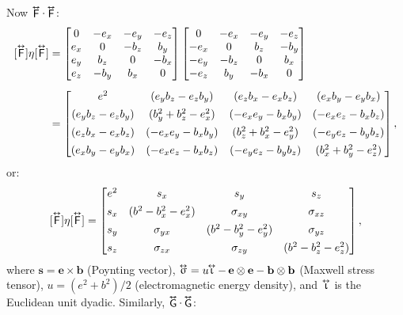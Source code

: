 \documentclass[12pt]{article}
\renewcommand{\vv}[1]{\mathbf{#1}}
\newcommand{\tightoverset}[2]{%
  \mathop{#2}\limits^{\vbox to -.5ex{\kern-0.75ex\hbox{$#1$}\vss}}}
\newcommand{\inlinedy}[1]{\tightoverset{\text{\tiny$\bm\leftrightarrow$}}{#1}}
\newcommand{\capdy}[1]{ \overset{ \text{\tiny$\bm\leftrightarrow$} }{\vphantom{\text{\small{A}}}\smash{#1}} }
\begin{document}
Now $\inlinedy{\mathsf{F}} \cdot \inlinedy{\mathsf{F}}$:
\begin{equation*}
\begin{aligned}
\mkern0mu [\capdy{\mathsf{F}}] \eta [\capdy{\mathsf{F}}]
&=
\begin{bmatrix}
0 & -e_x & -e_y & -e_z \\
e_x & 0 & -b_z & b_y \\
e_y & b_z & 0 & -b_x \\
e_z & -b_y & b_x & 0
\end{bmatrix}
\begin{bmatrix}
0 & -e_x & -e_y & -e_z \\
-e_x & 0 & b_z & -b_y \\
-e_y & -b_z & 0 & b_x \\
-e_z & b_y & -b_x & 0
\end{bmatrix} \\[5pt]
&=
\begin{bmatrix}
e^2 & (e_y b_z - e_z b_y) & (e_z b_x - e_x b_z) & (e_x b_y - e_y b_x) \\[1ex]
(e_y b_z - e_z b_y) & (b_y^2 + b_z^2 - e_x^2) & (-e_x e_y - b_x b_y) & (- e_x e_z - b_x b_z) \\[1ex]
(e_z b_x - e_x b_z) & (-e_x e_y - b_x b_y) & (b_z^2 + b_x^2 - e_y^2)  & (- e_y e_z - b_y b_z) \\[1ex]
(e_x b_y - e_y b_x) & (- e_x e_z - b_x b_z) & (- e_y e_z - b_y b_z) & (b_x^2 + b_y^2 - e_z^2)
\end{bmatrix} ,
\end{aligned}
\end{equation*}
or:
\begin{equation*}
\mkern0mu [\capdy{\mathsf{F}}] \eta [\capdy{\mathsf{F}}]
=
\begin{bmatrix}
e^2 & s_x & s_y & s_z \\[1ex]
s_x & (b^2 - b_x^2 - e_x^2) & \sigma_{x y} & \sigma_{x z} \\[1ex]
s_y & \sigma_{y x} & (b^2 - b_y^2 - e_y^2)  & \sigma_{y z} \\[1ex]
s_z & \sigma_{z x} & \sigma_{z y} & (b^2 - b_z^2 - e_z^2) 
\end{bmatrix} ,
\end{equation*}
where $\vv s = \vv e \times \vv b$ (Poynting vector), $\inlinedy{\upsigma} = u \mkern-5mu \inlinedy{\upiota} - \, \vv e \otimes \vv e - \vv b \otimes \vv b$ (Maxwell stress tensor), $u = (e^2 + b^2) / 2$ (electromagnetic energy density), and $\inlinedy{\upiota}$ is the Euclidean unit dyadic. Similarly, $\inlinedy{\mathsf{G}} \cdot \inlinedy{\mathsf{G}}$:
\end{document}
